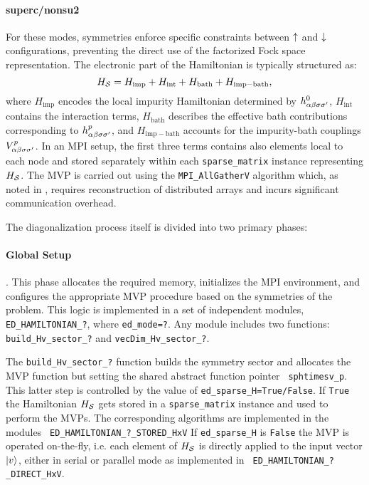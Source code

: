 \documentclass[edipack2.tex]{subfiles}
\begin{document}
\paragraph{\bf superc/nonsu2}
For these modes, symmetries enforce specific constraints between
$\uparrow$ and $\downarrow$ configurations, preventing the direct use of the
factorized Fock space representation. The electronic
part of the Hamiltonian is typically structured as:
\begin{equation}
H_{\cal S} = H_\mathrm{imp} + H_\mathrm{int} + H_\mathrm{bath} + H_\mathrm{imp-bath},
\end{equation}
where $H_\mathrm{imp}$ encodes the local impurity Hamiltonian
determined by $h^0_{\alpha\beta\sigma\sigma'}$,
$H_\mathrm{int}$ contains the interaction terms, $H_\mathrm{bath}$
describes the effective bath contributions corresponding to
$h^p_{\alpha\beta\sigma\sigma'}$, and $H_\mathrm{imp-bath}$ accounts for the
impurity-bath couplings $V^p_{\alpha\beta\sigma\sigma'}$.
In an MPI setup, the first three terms contains also elements local to each node and
stored separately within each {\tt sparse\_matrix} instance representing $H_{\cal S}$.
The MVP is carried out using the {\tt MPI\_AllGatherV} algorithm which, as noted in
, requires reconstruction of distributed
arrays and incurs significant communication overhead.




The diagonalization process itself is divided into two primary phases:

\paragraph{\bf Global Setup}. This phase allocates the required memory, initializes
the MPI environment, and configures the appropriate MVP procedure
based on the symmetries of the problem. This logic is implemented in
a set of independent modules, {\tt ED\_HAMILTONIAN\_?}, where
{\tt ed\_mode=?}. Any module includes two functions: {\tt build\_Hv\_sector\_?} and  {\tt vecDim\_Hv\_sector\_?}.

The {\tt build\_Hv\_sector\_?} function builds the symmetry sector and
allocates the MVP function but setting the shared abstract function pointer {\tt
  sphtimesv\_p}. This latter step is controlled by the value of
{\tt ed\_sparse\_H=True/False}. If {\tt True} the Hamiltonian $H_{\cal S}$
gets stored in a {\tt sparse\_matrix} instance and used to perform
the MVPs. The corresponding algorithms are implemented in the modules {\tt
  ED\_HAMILTONIAN\_?\_STORED\_HxV}
If {\tt ed\_sparse\_H} is {\tt False} the MVP is operated on-the-fly,
i.e. each element of $H_{\cal S}$ is directly applied to the input
vector $|v\rangle$, either in serial or parallel mode as implemented in {\tt
  ED\_HAMILTONIAN\_?\_DIRECT\_HxV}.  
\end{document}
